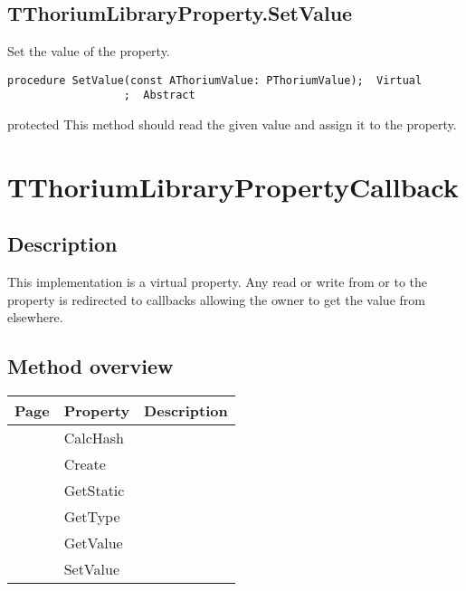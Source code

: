\subsection{TThoriumLibraryProperty.SetValue}
\label{thoriumcorepkg:thorium:tthoriumlibraryproperty:setvalue}
\begin{FPCList}
\Synopsis
Set the value of the property.\Declaration 

\begin{verbatim}
procedure SetValue(const AThoriumValue: PThoriumValue);  Virtual
                  ;  Abstract
\end{verbatim}
\Visibility
protected
\Description
This method should read the given value and assign it to the property.\end{FPCList}
\section{TThoriumLibraryPropertyCallback}
\label{thoriumcorepkg:thorium:tthoriumlibrarypropertycallback}
\subsection{Description}
This implementation is a virtual property. Any read or write from or to the property is redirected to callbacks allowing the owner to get the value from elsewhere.%
\subsection{Method overview}
\label{thoriumcorepkg:thorium:tthoriumlibrarypropertycallback:methods}
\begin{tabularx}{\textwidth}{llX}
Page & Property & Description  \\ \hline
\pageref{thoriumcorepkg:thorium:tthoriumlibrarypropertycallback:calchash} & CalcHash  &  \\
\pageref{thoriumcorepkg:thorium:tthoriumlibrarypropertycallback:create} & Create  &  \\
\pageref{thoriumcorepkg:thorium:tthoriumlibrarypropertycallback:getstatic} & GetStatic  &  \\
\pageref{thoriumcorepkg:thorium:tthoriumlibrarypropertycallback:gettype} & GetType  &  \\
\pageref{thoriumcorepkg:thorium:tthoriumlibrarypropertycallback:getvalue} & GetValue  &  \\
\pageref{thoriumcorepkg:thorium:tthoriumlibrarypropertycallback:setvalue} & SetValue  &  \\
\hline
\end{tabularx}
